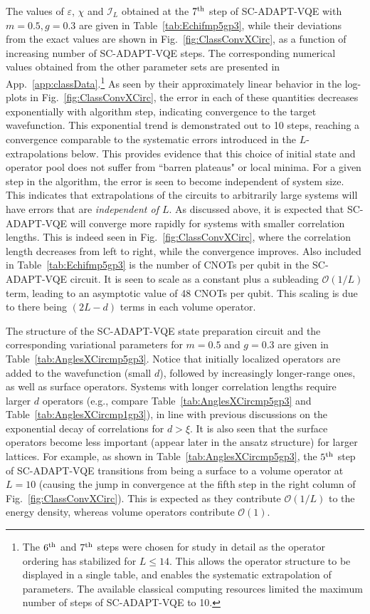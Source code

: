 \documentclass[aps, pra, onecolumn, tightenlines, letterpaper, amsmath, amssymb, preprintnumbers, floatfix, longbibliography, nofootinbib]{revtex4-2}
\newcommand{\infiL}{{\mathcal{I}_L}}
\begin{document}
The values of $\varepsilon$, $\chi$ and $\infiL$ obtained at 
the $7^{\rm th}$ step of SC-ADAPT-VQE with $m=0.5, g=0.3$ are given in 
Table~\ref{tab:Echifmp5gp3},
while their deviations from the exact values 
are shown in Fig.~\ref{fig:ClassConvXCirc},
as a function of increasing number of SC-ADAPT-VQE steps.
The corresponding numerical values obtained from the other parameter sets are presented in App.~\ref{app:classData}.\footnote{The $6^{\rm th}$ and $7^{\rm th}$ steps were chosen for study in detail as the operator ordering has stabilized for $L\leq 14$. This allows the operator structure to be displayed in a single table, and enables the systematic extrapolation of parameters. 
The available classical computing resources limited the maximum number of steps of SC-ADAPT-VQE to 10.}
As seen by their approximately linear behavior in the log-plots in Fig.~\ref{fig:ClassConvXCirc}, 
the error in each of these quantities decreases exponentially with algorithm step,
indicating convergence to the target wavefunction.
This exponential trend is demonstrated out to 10 steps, reaching a convergence comparable to the systematic errors introduced in the $L$-extrapolations below.
This provides evidence that this choice of initial state and operator pool does not suffer from ``barren plateaus" or local minima.
For a given step in the algorithm, 
the error is seen to become independent of system size.
This indicates that 
extrapolations of the circuits to arbitrarily large systems will have errors that are {\it independent of $L$}.
As discussed above, it is expected that SC-ADAPT-VQE will converge more rapidly for systems with smaller correlation lengths.
This is indeed seen in Fig.~\ref{fig:ClassConvXCirc}, 
where the correlation length decreases from left to right, while the convergence improves.
Also included in Table~\ref{tab:Echifmp5gp3} is the number of CNOTs per qubit in the SC-ADAPT-VQE circuit. 
It is seen to  scale as a constant plus a subleading ${\mathcal O}(1/L)$ term,
leading to an asymptotic value of 48 CNOTs per qubit.
This scaling is due to there being $(2L-d)$ terms in each volume operator.

The structure of the SC-ADAPT-VQE state preparation circuit and the corresponding variational parameters for $m=0.5$ and $g=0.3$ 
are given in Table~\ref{tab:AnglesXCircmp5gp3}.
Notice that initially localized operators are added to the wavefunction (small $d$), 
followed by increasingly longer-range ones, as well as surface operators. Systems with longer correlation lengths require larger $d$ operators (e.g., compare Table~\ref{tab:AnglesXCircmp5gp3} and Table~\ref{tab:AnglesXCircmp1gp3}), 
in line with previous discussions on the exponential decay of correlations for $d > \xi$.
It is also seen that the surface operators become less important 
(appear later in the ansatz structure) for larger lattices.
For example, as shown in Table~\ref{tab:AnglesXCircmp5gp3}, the $5^{{\rm th}}$ step of SC-ADAPT-VQE transitions from being a surface to a volume operator at $L=10$ (causing the jump in convergence at the fifth step in the right column of Fig.~\ref{fig:ClassConvXCirc}).
This is expected as they contribute ${\mathcal O}(1/L)$ 
to the energy density, whereas volume operators contribute ${\mathcal O}(1)$.
\end{document}
